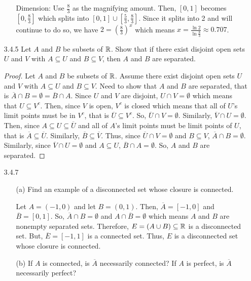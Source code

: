 \documentclass[12pt,letterpaper]{article}
\begin{document}
\begin{itemize}[leftmargin=!,labelindent=5pt]
\begin{itemize}
                    Dimension: Use $\frac{8}{3}$ as the magnifying amount.
                    Then, $[0,1]$ becomes $[0,\frac{8}{3}]$ which splits into $[0,1]\cup [\frac{5}{3}, \frac{8}{3}]$.
                    Since it splits into 2 and will continue to do so, we have $2 = (\frac{8}{3})^x$ which means $x = \frac{\ln 2}{\ln \frac{8}{3}} \approx 0.707$.
            \end{itemize}
        \item [3.4.5] Let $A$ and $B$ be subsets of $\mathbb{R}$. Show that if there exist disjoint open sets $U$ and $V$ with $A \subseteq U$ and $B \subseteq V$, then $A$ and $B$ are separated.
            \begin{proof}
                Let $A$ and $B$ be subsets of $\mathbb{R}$.
                Assume there exist disjoint open sets $U$ and $V$ with $A \subseteq U$ and $B \subseteq V$.
                Need to show that $A$ and $B$ are separated, that is $\overline{A} \cap B = \emptyset = \overline{B} \cap A$.
                Since $U$ and $V$ are disjoint, $U \cap V = \emptyset$ which means that $U \subseteq V^c$.
                Then, since $V$ is open, $V^c$ is closed which means that all of $U$'s limit points must be in $V^c$, that is $\overline{U} \subseteq V^c$.
                So, $\overline{U} \cap V = \emptyset$.
                Similarly, $\overline{V} \cap U = \emptyset$.
                Then, since $A \subseteq U \subseteq \overline{U}$ and all of $A$'s limit points must be limit points of $U$, that is $\overline{A} \subseteq \overline{U}$.
                Similarly, $\overline{B} \subseteq \overline{V}$.
                Thus, since $\overline{U} \cap V = \emptyset$ and $B \subseteq V$, $\overline{A} \cap B = \emptyset$.
                Similarly, since $\overline{V} \cap U = \emptyset$ and $A \subseteq U$, $\overline{B} \cap A = \emptyset$.
                So, $A$ and $B$ are separated.
            \end{proof}
        \item [3.4.7]
            \begin{itemize}
                \item [(a)] Find an example of a disconnected set whose closure is connected.
                
                    Let $A = (-1, 0)$ and let $B = (0, 1)$.
                    Then, $\overline{A} = [-1, 0]$ and $\overline{B} = [0, 1]$.
                    So, $\overline{A} \cap B = \emptyset$ and $A \cap \overline{B} = \emptyset$ which means $A$ and $B$ are nonempty separated sets.
                    Therefore, $E = (A \cup B) \subseteq \mathbb{R}$ is a disconnected set.
                    But, $\overline{E} = [-1, 1]$ is a connected set.
                    Thus, $E$ is a disconnected set whose closure is connected.
                \item [(b)] If $A$ is connected, is $\overline{A}$ necessarily connected? If $A$ is perfect, is $\overline{A}$ necessarily perfect?
                

\end{itemize}
\end{itemize}
\end{document}
